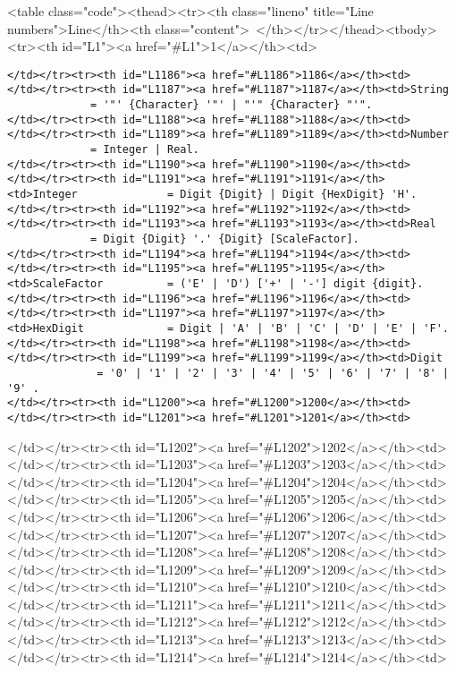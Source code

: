 <table class="code"><thead><tr><th class="lineno" title="Line numbers">Line</th><th class="content"> </th></tr></thead><tbody><tr><th id="L1"><a href="#L1">1</a></th><td>\documentclass[a4paper,11pt]{article}
\begin{document}
\begin{lstlisting}[language = EBNF, frame=none,xleftmargin=0mm]
</td></tr><tr><th id="L1186"><a href="#L1186">1186</a></th><td>
</td></tr><tr><th id="L1187"><a href="#L1187">1187</a></th><td>String               = '"' {Character} '"' | "'" {Character} "'".
</td></tr><tr><th id="L1188"><a href="#L1188">1188</a></th><td>
</td></tr><tr><th id="L1189"><a href="#L1189">1189</a></th><td>Number               = Integer | Real.
</td></tr><tr><th id="L1190"><a href="#L1190">1190</a></th><td>
</td></tr><tr><th id="L1191"><a href="#L1191">1191</a></th><td>Integer              = Digit {Digit} | Digit {HexDigit} 'H'.
</td></tr><tr><th id="L1192"><a href="#L1192">1192</a></th><td>
</td></tr><tr><th id="L1193"><a href="#L1193">1193</a></th><td>Real                 = Digit {Digit} '.' {Digit} [ScaleFactor].
</td></tr><tr><th id="L1194"><a href="#L1194">1194</a></th><td>
</td></tr><tr><th id="L1195"><a href="#L1195">1195</a></th><td>ScaleFactor          = ('E' | 'D') ['+' | '-'] digit {digit}.
</td></tr><tr><th id="L1196"><a href="#L1196">1196</a></th><td>
</td></tr><tr><th id="L1197"><a href="#L1197">1197</a></th><td>HexDigit             = Digit | 'A' | 'B' | 'C' | 'D' | 'E' | 'F'.
</td></tr><tr><th id="L1198"><a href="#L1198">1198</a></th><td>
</td></tr><tr><th id="L1199"><a href="#L1199">1199</a></th><td>Digit                = '0' | '1' | '2' | '3' | '4' | '5' | '6' | '7' | '8' | '9' .
</td></tr><tr><th id="L1200"><a href="#L1200">1200</a></th><td>
</td></tr><tr><th id="L1201"><a href="#L1201">1201</a></th><td>\end{lstlisting}
</td></tr><tr><th id="L1202"><a href="#L1202">1202</a></th><td>
</td></tr><tr><th id="L1203"><a href="#L1203">1203</a></th><td>
</td></tr><tr><th id="L1204"><a href="#L1204">1204</a></th><td>
</td></tr><tr><th id="L1205"><a href="#L1205">1205</a></th><td>%
</td></tr><tr><th id="L1206"><a href="#L1206">1206</a></th><td>%
</td></tr><tr><th id="L1207"><a href="#L1207">1207</a></th><td>%
</td></tr><tr><th id="L1208"><a href="#L1208">1208</a></th><td>%
</td></tr><tr><th id="L1209"><a href="#L1209">1209</a></th><td>%
</td></tr><tr><th id="L1210"><a href="#L1210">1210</a></th><td>%
</td></tr><tr><th id="L1211"><a href="#L1211">1211</a></th><td>%
</td></tr><tr><th id="L1212"><a href="#L1212">1212</a></th><td>
</td></tr><tr><th id="L1213"><a href="#L1213">1213</a></th><td>
</td></tr><tr><th id="L1214"><a href="#L1214">1214</a></th><td>
\end{document}
